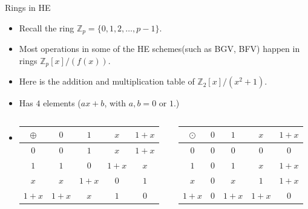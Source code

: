 \documentclass[ %
usenames,dvipsnames,
aspectratio=169,11pt]{beamer}
\newenvironment{stepitemize}{\begin{itemize}[<+->]}{\end{itemize} }
\newcommand{\Z}{\mathbb{Z}}
\begin{document}
\begin{frame}{Rings in HE}
\begin{stepitemize}
\item Recall the ring $\Z_p=\{0,1,2, \dots, p-1\}$. 
    \item Most operations in some of the HE schemes(such as BGV, BFV) happen in rings $\Z_p[x]/(f(x))$.
    \item Here is the addition and multiplication table of $\Z_2[x]/(x^2+1)$.
    \item Has $4$ elements ($ax+b$, with $a,b=0$ or $1$.) 
    
    \bigskip
    \item []
    \bigskip
    
    \begin{columns}
        \begin{column}{0.5\textwidth}
     \begin{table}
            \begin{tabular}{ c| c | c |c|c}
$\oplus$  & $0$ & $1$ & $x$ & $1+x$\\
\hline
$0$ & $0$ & $1$ & $x$ & $1+x$ \\
\hline 
$1$ & $1$ & $0$ & $1+x$ & $x$ \\
\hline
$x$& $x$ & $1+x$ &$0$ & $1$\\
\hline
$1+x$& $1+x$ & $x$ &$1$ & $0$ 
\end{tabular}
\end{table}
    \end{column}
    
        \begin{column}{0.4\textwidth}
    \begin{table}
            \begin{tabular}{ c| c | c |c|c}
$\odot$  & $0$ & $1$ & $x$ & $1+x$\\
\hline
$0$ & $0$ & $0$ & $0$ & $0$ \\
\hline 
$1$ & $0$ & $1$ & $x$ & $1+x$ \\
\hline
$x$& $0$ & $x$ &$1$ & $1+x$\\
\hline
$1+x$& $0$ & $1+x$ &$1+x$ & $0$
\end{tabular}
\end{table}
    \end{column}
\end{columns}
    
\end{stepitemize}
\end{frame}
\end{document}
